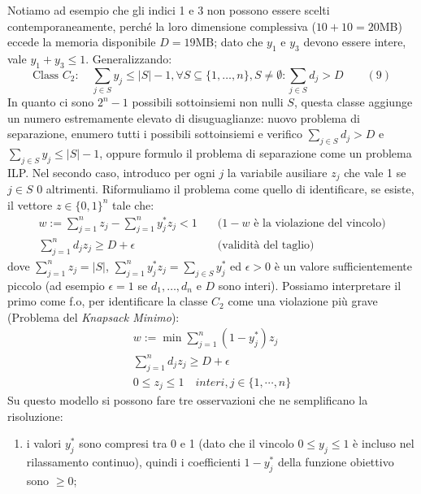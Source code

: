 \begin{itemize}
	Notiamo ad esempio che gli indici 1 e 3 non possono essere scelti contemporaneamente, perché la loro dimensione complessiva ($10+10=20$MB) eccede la memoria disponibile $D=19$MB; dato che $y_1$ e $y_3$ devono essere intere, vale $y_1+y_3\le 1$. Generalizzando:
	\begin{equation*}
		\textrm{Class } C_2:\quad \sum_{j\in S}y_j\le |S|-1, \forall S\subseteq \{1,\dots, n\}, S\neq \emptyset:\sum_{j\in S}d_j>D \qquad (9)
	\end{equation*}
	In quanto ci sono $2^n-1$ possibili sottoinsiemi non nulli $S$, questa classe aggiunge un numero estremamente elevato di disuguaglianze: nuovo problema di separazione, enumero tutti i possibili sottoinsiemi e verifico $\sum_{j\in S}d_j>D$ e $\sum_{j\in S}y_j\le |S|-1$, oppure formulo il problema di separazione come un problema ILP. Nel secondo caso, introduco per ogni $j$ la variabile ausiliare $z_j$ che vale 1 se $j\in S$ 0 altrimenti. Riformuliamo il problema come quello di identificare, se esiste, il vettore $z\in \{0,1\}^n$ tale che:
	\begin{equation*}
		\begin{aligned}
			w:=\sum_{j=1}^nz_j-\sum_{j=1}^ny_j^*z_j<1 & \quad \textrm{($1-w$ è la violazione del vincolo)}\\
			\sum_{j=1}^nd_jz_j\ge D+\epsilon & \quad \textrm{(validità del taglio)}
		\end{aligned}
	\end{equation*}
	dove $\sum_{j=1}^nz_j=|S|$, $\sum_{j=1}^ny_j^*z_j=\sum_{j\in S}y_j^*$ ed $\epsilon>0$ è un valore sufficientemente piccolo (ad esempio $\epsilon=1$ se $d_1,\dots,d_n$ e $D$ sono interi).
	Possiamo interpretare il primo come f.o, per identificare la classe $C_2$ come una violazione più grave (Problema del \textit{Knapsack Minimo}):
	\begin{equation*}
		\begin{aligned}
			w:=\min \sum_{j=1}^n(1-y_j^*)z_j\\
			\sum_{j=1}^nd_jz_j\ge D+\epsilon\\
			0\le z_j\le 1 \quad interi, j\in \{1,\cdots, n\}
		\end{aligned}
	\end{equation*}
	Su questo modello si possono fare tre osservazioni che ne semplificano la risoluzione:
	\begin{enumerate}
		\item i valori $y_j^*$ sono compresi tra 0 e 1 (dato che il vincolo $0\le y_j\le 1$ è incluso nel rilassamento continuo), quindi i coefficienti $1-y_j^*$ della funzione obiettivo sono $\ge 0$;

\end{enumerate}
\end{itemize}
